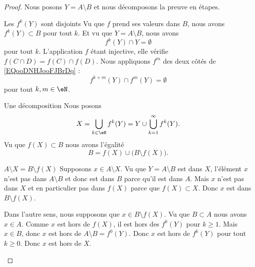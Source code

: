 \begin{proof}
    Nous posons \( Y=A\setminus B\) et nous décomposons la preuve en étapes.
    \begin{subproof}
        \item[Les \( f^k(Y)\) sont disjoints]
            Vu que \( f\) prend ses valeurs dans \( B\), nous avons \( f^k(Y)\subset B\) pour tout \( k\). Et vu que \( Y=A\setminus B\), nous avons
            \begin{equation}        \label{EQooDNHJooFJBrDq}
                f^k(Y)\cap Y=\emptyset
            \end{equation}
            pour tout \( k\). L'application \( f\) étant injective, elle vérifie \( f(C\cap D)=f(C)\cap f(D)\). Nous appliquons \( f^m\) des deux côtés de \eqref{EQooDNHJooFJBrDq} :
            \begin{equation}
                f^{k+m}(Y)\cap f^m(Y)=\emptyset
            \end{equation}
            pour tout \( k,m\in \eN\).
        \item[Une décomposition] 
            Nous posons
            \begin{equation}
                X=\bigcup_{k\in \eN}f^k(Y)=Y\cup\bigcup_{k=1}^{\infty}f^k(Y).
            \end{equation}
            Vu que \( f(X)\subset B\) nous avons l'égalité
            \begin{equation}
                B=f(X)\cup\big(B\setminus f(X)\big).
            \end{equation}
        \item[\( A\setminus X=B\setminus f(X)\)]
            Supposons \( x\in A\setminus X\). Vu que \( Y=A\setminus B\) est dans \( X\), l'élément \( x\) n'est pas dans \( A\setminus B\) et donc est dans \( B\) parce qu'il est dans \( A\). Mais \( x\) n'est pas dans \( X\) et en particulier pas dans \( f(X)\) parce que \( f(X)\subset X\). Donc \( x\) est dans \( B\setminus f(X)\).

            Dans l'autre sens, nous supposons que \( x\in B\setminus f(X)\). Vu que \( B\subset A\) nous avons \( x\in A\). Comme \( x\) est hors de \( f(X)\), il est hors des \( f^k(Y)\) pour \( k\geq 1\). Mais \( x\in B\), donc \( x\) est hors de \( A\setminus B=f^0(Y)\). Donc \( x\) est hors de \( f^k(Y)\) pour tout \( k\geq 0\). Donc \( x\) est hors de \( X\).


\end{subproof}
\end{proof}
